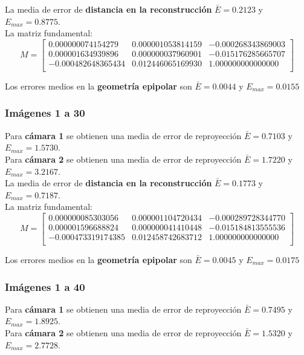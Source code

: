 \documentclass[a4paper, fontsize=11pt]{scrartcl} %
\numberwithin{equation}{section} %
\numberwithin{figure}{section} %
\numberwithin{table}{section} %
\begin{document}
	La media de error de \textbf{distancia en la reconstrucción} $\bar{E} = 0.2123$ y $E_{max} = 0.8775$.\\
	La matriz fundamental:
	\[
	M=
	\begin{bmatrix}
	0.000000074154279&	0.000001053814159&	-0.000268343869003 \\
	0.000001634939896&	0.000000037960901&	-0.015176285665707 \\
	-0.000482648365434&	0.012446065169930&	1.000000000000000  \\
	
	\end{bmatrix}
	\]
	
	Los errores medios en la \textbf{geometría epipolar} son $\bar{E} = 0.0044$ y $E_{max} = 0.0155$
	
	\subsubsection*{Imágenes 1 a 30}
	
	Para \textbf{cámara 1} se obtienen una media de error de reproyección $\bar{E} = 0.7103$ y $E_{max} = 1.5730$.\\
	Para \textbf{cámara 2} se obtienen una media de error de reproyección $\bar{E} = 1.7220$ y $E_{max} = 3.2167$.\\
	
	La media de error de \textbf{distancia en la reconstrucción} $\bar{E} = 0.1773$ y $E_{max} = 0.7187$.\\
	La matriz fundamental:
	\[
	M=
	\begin{bmatrix}
	0.000000085303056&	0.000001104720434&	-0.000289728344770 \\
	0.000001596688824&	0.000000041410448&	-0.015184813555536 \\
	-0.000473319174385&	0.012458742683712&	1.000000000000000  \\
	
	\end{bmatrix}
	\]
	
	Los errores medios en la \textbf{geometría epipolar} son $\bar{E} =  0.0045$ y $E_{max} = 0.0175$
	
	\subsubsection*{Imágenes 1 a 40}
	
	Para \textbf{cámara 1} se obtienen una media de error de reproyección $\bar{E} = 0.7495$ y $E_{max} = 1.8925$.\\
	Para \textbf{cámara 2} se obtienen una media de error de reproyección $\bar{E} = 1.5320$ y $E_{max} = 2.7728$.\\
	
\end{document}
